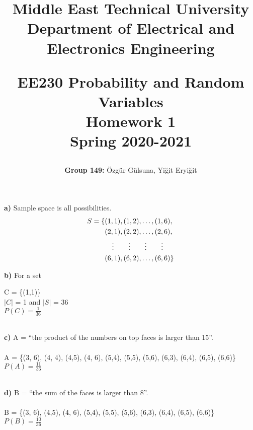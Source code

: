\documentclass{METUHW} %
\newcommand*{\CenterVdots}{\makebox[\widthof{(0,0),}][c]{\vdots}}
\begin{document}
\title{{%
\vspace{-3cm}
\small
Middle East Technical University\\
Department of Electrical and Electronics Engineering\\
}%
\LARGE

\textbf{EE230 Probability and Random Variables}\\

\LARGE
\textbf{
Homework 1
}\\
\small
Spring 2020-2021
}

\author{\textbf{Group 149:} Özgür Gülsuna, Yiğit Eryiğit}
\date{}
\maketitle

\HWproblem
\raggedright
\textbf{a)} Sample space is all possibilities.
\begin{align*}
    S = \{&(1, 1), (1, 2), \dots, (1, 6), \\
          &(2, 1), (2, 2), \dots, (2, 6), \\
          &\CenterVdots  \CenterVdots  \CenterVdots \CenterVdots \\
          &(6, 1), (6, 2), \dots, (6, 6) \}
\end{align*}
\raggedright
\textbf{b)} For a set 

\centering
C = \{(1,1)\} \\
$\lvert C \rvert$ = 1 and $\lvert S \rvert$ = 36\\
 $P(C) = \frac{1}{36}$ \\
\raggedright
\text{}\\


\textbf{c)} A = “the product of the numbers on top faces is larger than 15”.\\
\centering
\text{}\\
    A =  \{(3, 6), (4, 4), (4,5), (4, 6), (5,4), (5,5), (5,6), (6,3), (6,4), (6,5), (6,6)\}
\text{}\\
 $P(A) = \frac{11}{36}$ \\
\raggedright
\text{}\\

\textbf{d)} B = “the sum of the faces is larger than 8”.\\
\centering
\text{}\\
    B =  \{(3, 6), (4,5), (4, 6), (5,4), (5,5), (5,6), (6,3), (6,4), (6,5), (6,6)\}
\text{}\\
 $P(B) = \frac{10}{36}$ \\
\end{document}
